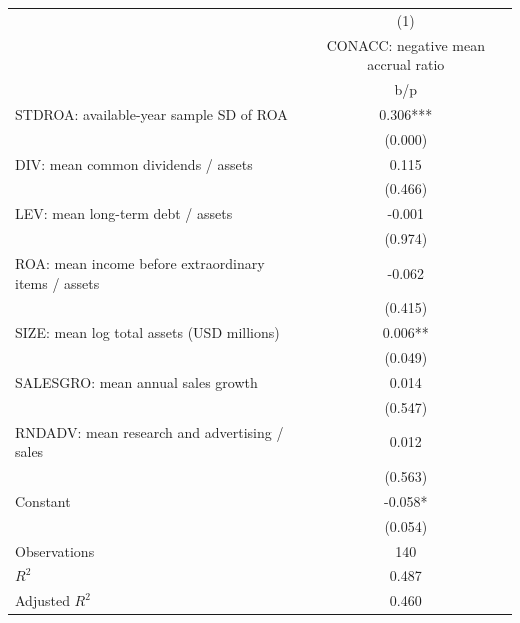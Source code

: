 {
\def\sym#1{\ifmmode^{#1}\else\(^{#1}\)\fi}
\begin{tabular}{l*{1}{c}}
\hline\hline
                    &\multicolumn{1}{c}{(1)}\\
                    &\multicolumn{1}{c}{CONACC: negative mean accrual ratio}\\
                    &         b/p   \\
\hline
STDROA: available-year sample SD of ROA&       0.306***\\
                    &     (0.000)   \\
DIV: mean common dividends / assets&       0.115   \\
                    &     (0.466)   \\
LEV: mean long-term debt / assets&      -0.001   \\
                    &     (0.974)   \\
ROA: mean income before extraordinary items / assets&      -0.062   \\
                    &     (0.415)   \\
SIZE: mean log total assets (USD millions)&       0.006** \\
                    &     (0.049)   \\
SALESGRO: mean annual sales growth&       0.014   \\
                    &     (0.547)   \\
RNDADV: mean research and advertising / sales&       0.012   \\
                    &     (0.563)   \\
Constant            &      -0.058*  \\
                    &     (0.054)   \\
\hline
Observations        &         140   \\
\(R^{2}\)           &       0.487   \\
Adjusted \(R^{2}\)  &       0.460   \\
\hline\hline
\end{tabular}
}
